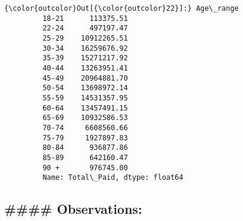 \documentclass[11pt]{article}
\begin{document}
\begin{Verbatim}[commandchars=\\\{\}]
{\color{outcolor}Out[{\color{outcolor}22}]:} Age\_range
         18-21      113375.51
         22-24      497197.47
         25-29    10912265.51
         30-34    16259676.92
         35-39    15271217.92
         40-44    13263951.41
         45-49    20964881.70
         50-54    13698972.14
         55-59    14531357.95
         60-64    13457491.15
         65-69    10932586.53
         70-74     6608560.66
         75-79     1927897.83
         80-84      936877.86
         85-89      642160.47
         90 +       976745.00
         Name: Total\_Paid, dtype: float64
\end{Verbatim}
            
    \hypertarget{observations}{%
\subsection{\#\#\#\# Observations:}\label{observations}}
\end{document}
